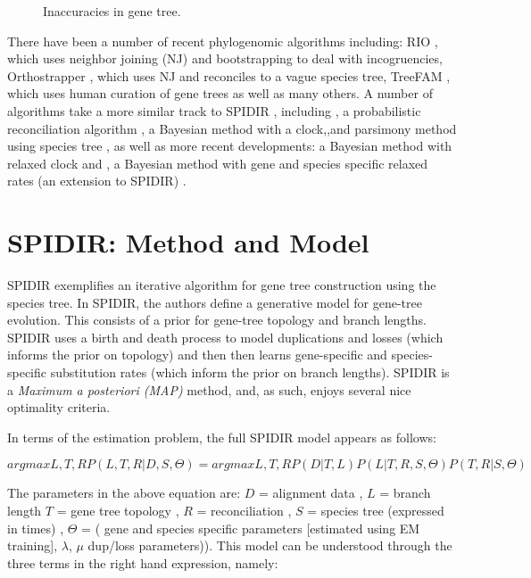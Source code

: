 \begin{figure} [ht!] 
  \centering 
  \caption{Inaccuracies in gene tree.}
  \label{Fig19_GeneTreeInaccuracies}
\end{figure} 

There have been a number of recent phylogenomic algorithms including:
RIO \cite{Zmasek}, which uses neighbor joining (NJ) and bootstrapping
to deal with incogruencies, Orthostrapper \cite{Storm}, which uses NJ
and reconciles to a vague species tree, TreeFAM \cite{Li}, which uses
human curation of gene trees as well as many others. A number of
algorithms take a more similar track to SPIDIR \cite{Rasmussen},
including \cite{Arvestad}, a probabilistic reconciliation algorithm
\cite{Hollich}, a Bayesian method with a clock,\cite{Wapinski},and
parsimony method using species tree , as well as more recent
developments: \cite{Akerborg} a Bayesian method with relaxed clock and
\cite{Rasmussen2011}, a Bayesian method with gene and species specific
relaxed rates (an extension to SPIDIR) .

\section{SPIDIR: Method and Model} 
SPIDIR exemplifies an iterative algorithm for gene tree construction
using the species tree. In SPIDIR, the authors define a generative
model for gene-tree evolution. This consists of a prior for gene-tree
topology and branch lengths. SPIDIR uses a birth and death process to
model duplications and losses (which informs the prior on topology)
and then then learns gene-specific and species-specific substitution
rates (which inform the prior on branch lengths). SPIDIR is a
\textit{Maximum a posteriori (MAP)} method, and, as such, enjoys
several nice optimality criteria.

In terms of the estimation problem, the full SPIDIR model appears as
follows:

$argmax L,T,R P(L,T,R|D,S,\Theta) = argmax L,T,R P(D|T,L)P(L|T,R,S,\Theta)P(T,R|S,\Theta)$ 

The parameters in the above equation are: $D$ = alignment data , $L$ =
branch length $T$ = gene tree topology , $R$ = reconciliation , $S$ =
species tree (expressed in times) , $\Theta$ = ( gene and species
specific parameters [estimated using EM training], $\lambda$, $\mu$
dup/loss parameters)). This model can be understood through the three
terms in the right hand expression, namely:


